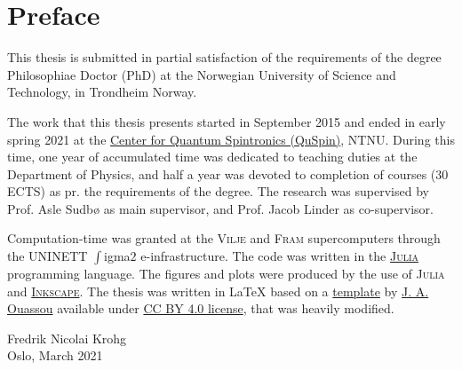 \chapter*{Preface}\noindent
%
This thesis is submitted in partial satisfaction of the requirements of the degree Philosophiae Doctor (PhD) at the
Norwegian University of Science and Technology, in Trondheim Norway.

The work that this thesis presents started in September 2015 and ended in early spring 2021 at the
\href{https://www.ntnu.edu/quspin/center-for-quantum-spintronics}{Center for Quantum Spintronics (QuSpin)}, \textsc{NTNU}. During this time, one
year of accumulated time was dedicated to teaching duties at the Department of Physics, and half a year
was devoted to completion of courses (30 ECTS) as pr. the requirements of the degree.
The research was supervised by
Prof. Asle Sudb{\o} as main supervisor, and Prof. Jacob Linder as co-supervisor.

Computation-time was granted at the \textsc{Vilje} and \textsc{Fram} supercomputers through the UNINETT $\int$igma$2$ e-infrastructure. The code was written in
the \href{https://julialang.org/}{\textsc{Julia}} programming language. The figures and plots were produced by the use of \textsc{Julia} and
\href{https://inkscape.org/}{\textsc{Inkscape}}. The thesis was written in {\LaTeX} based on a \href{https://creativecommons.org/licenses/by/4.0/}{template}
by \href{https://github.com/jabirali}{J. A. Ouassou} available under \href{https://creativecommons.org/licenses/by/4.0/}{CC BY 4.0 license},
that was heavily modified.

\vspace{2cm}

\noindent Fredrik Nicolai Krohg\\
Oslo, March 2021
